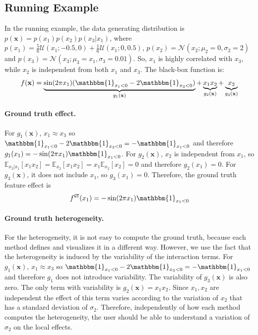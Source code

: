 \documentclass{article} %
\newcommand{\xb}{\mathbf{x}}
\begin{document}
\subsection{Running Example}
\label{sec:running-example}

In the running example, the data generating distribution is
$p(\xb) = p(x_1)p(x_2)p(x_3|x_1)$, where
$p(x_1) = \frac{5}{6} \mathcal{U}(x_1; -0.5, 0) + \frac{1}{6}\mathcal{U}(x_1; 0, 0.5)$,
$p(x_2) = \mathcal{N}(x_2; \mu_2 = 0, \sigma_2=2)$ and
$p(x_3) = \mathcal{N}(x_3; \mu_3 = x_1, \sigma_3=0.01)$.
So, $x_1$ is highly correlated with $x_3$, while $x_2$ is independent from both $x_1$ and $x_3$.
The black-box function is:
%
\begin{equation}
  \label{eq:target_function-1}
  f(\xb) = \underbrace{\sin(2 \pi x_1) (\mathbbm{1}_{x_1 < 0} - 2 \mathbbm{1}_{x_3 < 0})}_{g_1(\xb)}
  + \underbrace{x_1 x_2}_{g_2(\xb)} + \underbrace{x_2}_{g_3(\xb)}
\end{equation}
%

\paragraph{Ground truth effect.}

For $g_1(\xb)$, $x_1 \approx x_3$ so
$\mathbbm{1}_{x_1 < 0} - 2 \mathbbm{1}_{x_3 < 0} = - \mathbbm{1}_{x_1 < 0}$ and therefore
$g_1(x_1) = - \sin(2 \pi x_1) \mathbbm{1}_{x_1 < 0}$.
For $g_2(\xb)$, $x_2$ is independent from $x_1$,
so $\mathbb{E}_{x_2|x_1} [x_1x_2] = \mathbb{E}_{x_2} [x_1 x_2] = x_1 \mathbb{E}_{x_2} [x_2] = 0$
and therefore $g_2(x_1) = 0$.
For $g_3(\xb)$, it does not include $x_1$, so $g_3(x_1) = 0$.
Therefore, the ground truth feature effect is
%
\begin{equation}
    f^{\mathtt{GT}}(x_1) = - \sin(2 \pi x_1) \mathbbm{1}_{x_1 < 0}
\end{equation}
%

\paragraph{Ground truth heterogeneity.}

For the heterogeneity, it is not easy to compute the ground truth, because each method
defines and visualizes it in a different way.
However, we use the fact that the heterogeneity is induced by the variability of the interaction terms.
For $g_1(\xb)$, $x_1 \approx x_3$ so
$\mathbbm{1}_{x_1 < 0} - 2 \mathbbm{1}_{x_3 < 0} = - \mathbbm{1}_{x_1 < 0}$ and therefore
$g_1$ does not introduce variability.
The variability of $g_3(\xb)$ is also zero.
The only term with variability is $g_2(\xb) = x_1 x_2$.
Since $x_1, x_2$ are independent the effect of this term varies according to the variation of $x_2$
that has a standard deviation of $\sigma_2$.
Therefore, independently of how each method computes the heterogeneity, the user should be able to
understand a variation of $\sigma_2$ on the local effects.
\end{document}
